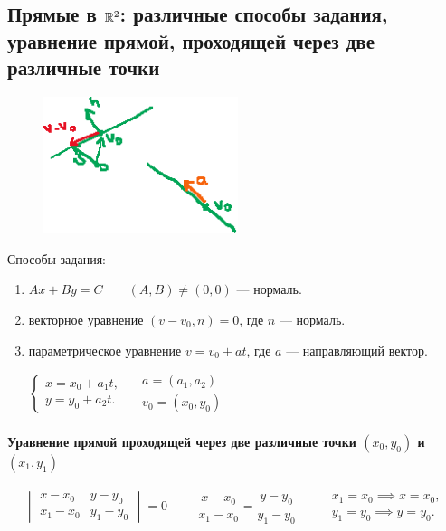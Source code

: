 \subsection{Прямые в $\mathbb{R}^2$: различные способы задания, уравнение прямой, проходящей через две различные точки}

\begin{figure}
    \includegraphics[height=4cm]{img/lecture26_drawing_1}
    \vspace{-110pt}
\end{figure}

Способы задания:
\begin{enumerate}
    \item $Ax + By = C \quad\quad (A, B) \neq (0, 0)$ --- нормаль.
    \item векторное уравнение $(v - v_0, n) = 0$, где $n$ --- нормаль.
    \item параметрическое уравнение $v = v_0 + at$, где $a$ --- направляющий вектор.

        \begin{math}
            \begin{cases}
                x = x_0 + a_1 t, \\
                y = y_0 + a_2 t.
            \end{cases} \quad
            \begin{gathered}
                a = (a_1, a_2) \\
                v_0 = (x_0, y_0)
            \end{gathered}
        \end{math}
\end{enumerate}

\paragraph{Уравнение прямой проходящей через две различные точки $(x_0, y_0)$ и $(x_1, y_1)$}

\begin{equation*}
    \begin{vmatrix} 
        x - x_0 & y - y_0 \\
        x_1 - x_0 & y_1 - y_0
    \end{vmatrix} = 0 \hspace{1cm}
    \frac{x - x_0}{x_1 - x_0} = \frac{y - y_0}{y_1 - y_0} \hspace{1cm}
    \begin{gathered}
        x_1 = x_0 \implies x = x_0, \\
        y_1 = y_0 \implies y = y_0.
    \end{gathered}
\end{equation*}


